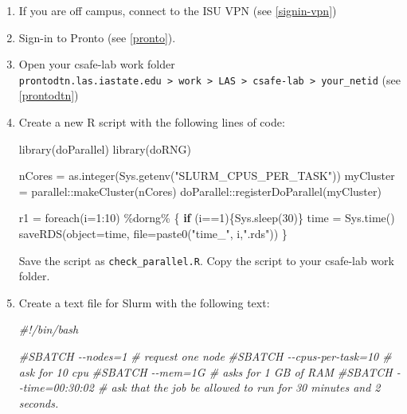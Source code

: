 \documentclass[
]{book}
\newenvironment{Shaded}{\begin{snugshade}}{\end{snugshade}}
\newcommand{\AttributeTok}[1]{\textcolor[rgb]{0.77,0.63,0.00}{#1}}
\newcommand{\CommentTok}[1]{\textcolor[rgb]{0.56,0.35,0.01}{\textit{#1}}}
\newcommand{\ControlFlowTok}[1]{\textcolor[rgb]{0.13,0.29,0.53}{\textbf{#1}}}
\newcommand{\DecValTok}[1]{\textcolor[rgb]{0.00,0.00,0.81}{#1}}
\newcommand{\FunctionTok}[1]{\textcolor[rgb]{0.00,0.00,0.00}{#1}}
\newcommand{\NormalTok}[1]{#1}
\newcommand{\OtherTok}[1]{\textcolor[rgb]{0.56,0.35,0.01}{#1}}
\newcommand{\SpecialCharTok}[1]{\textcolor[rgb]{0.00,0.00,0.00}{#1}}
\newcommand{\StringTok}[1]{\textcolor[rgb]{0.31,0.60,0.02}{#1}}
\begin{document}
\begin{enumerate}
\def\labelenumi{\arabic{enumi}.}
\item
  If you are off campus, connect to the ISU VPN (see \ref{signin-vpn})
\item
  Sign-in to Pronto (see \ref{pronto}).
\item
  Open your csafe-lab work folder \texttt{prontodtn.las.iastate.edu\ \textgreater{}\ work\ \textgreater{}\ LAS\ \textgreater{}\ csafe-lab\ \textgreater{}\ your\_netid} (see \ref{prontodtn})
\item
  Create a new R script with the following lines of code:

\begin{Shaded}
\begin{Highlighting}[]
\FunctionTok{library}\NormalTok{(doParallel)}
\FunctionTok{library}\NormalTok{(doRNG)}


\NormalTok{nCores }\OtherTok{=} \FunctionTok{as.integer}\NormalTok{(}\FunctionTok{Sys.getenv}\NormalTok{(}\StringTok{"SLURM\_CPUS\_PER\_TASK"}\NormalTok{))}
\NormalTok{myCluster }\OtherTok{=}\NormalTok{ parallel}\SpecialCharTok{::}\FunctionTok{makeCluster}\NormalTok{(nCores)}
\NormalTok{doParallel}\SpecialCharTok{::}\FunctionTok{registerDoParallel}\NormalTok{(myCluster)}

\NormalTok{r1 }\OtherTok{=} \FunctionTok{foreach}\NormalTok{(}\AttributeTok{i=}\DecValTok{1}\SpecialCharTok{:}\DecValTok{10}\NormalTok{) }\SpecialCharTok{\%dorng\%}\NormalTok{ \{}
  \ControlFlowTok{if}\NormalTok{ (i}\SpecialCharTok{==}\DecValTok{1}\NormalTok{)\{}\FunctionTok{Sys.sleep}\NormalTok{(}\DecValTok{30}\NormalTok{)\}}
\NormalTok{  time }\OtherTok{=} \FunctionTok{Sys.time}\NormalTok{()}
  \FunctionTok{saveRDS}\NormalTok{(}\AttributeTok{object=}\NormalTok{time, }\AttributeTok{file=}\FunctionTok{paste0}\NormalTok{(}\StringTok{"time\_"}\NormalTok{, i,}\StringTok{".rds"}\NormalTok{))}
\NormalTok{\}}
\end{Highlighting}
\end{Shaded}

  Save the script as \texttt{check\_parallel.R}. Copy the script to your csafe-lab work folder.
\item
  Create a text file for Slurm with the following text:

\begin{Shaded}
\begin{Highlighting}[]
\CommentTok{\#!/bin/bash}

\CommentTok{\#SBATCH {-}{-}nodes=1 \# request one node}
\CommentTok{\#SBATCH {-}{-}cpus{-}per{-}task=10  \# ask for 10 cpu}
\CommentTok{\#SBATCH {-}{-}mem=1G \#  asks for 1 GB of RAM}
\CommentTok{\#SBATCH {-}{-}time=00:30:02 \# ask that the job be allowed to run for 30 minutes and 2 seconds.}


\end{Highlighting}
\end{Shaded}
\end{enumerate}
\end{document}
